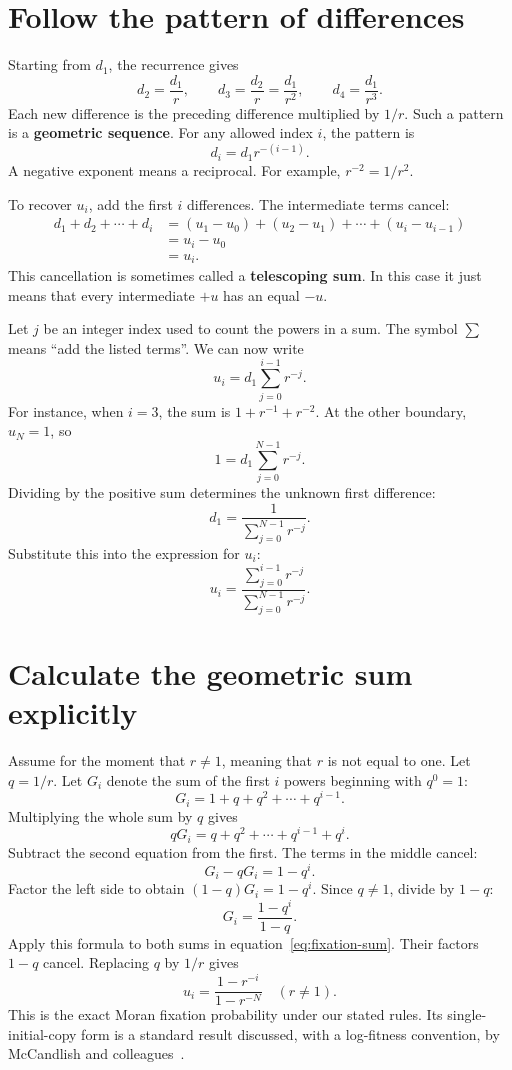 \section{Follow the pattern of differences}

Starting from \(d_1\), the recurrence gives
\[
 d_2=\frac{d_1}{r},\qquad
 d_3=\frac{d_2}{r}=\frac{d_1}{r^2},\qquad
 d_4=\frac{d_1}{r^3}.
\]
Each new difference is the preceding difference multiplied by \(1/r\).
Such a pattern is a \textbf{geometric sequence}. For any allowed index \(i\),
the pattern is
\[
 d_i=d_1r^{-(i-1)}.
\]
A negative exponent means a reciprocal. For example, \(r^{-2}=1/r^2\).

To recover \(u_i\), add the first \(i\) differences. The intermediate
terms cancel:
\begin{align*}
 d_1+d_2+\cdots+d_i
 &=(u_1-u_0)+(u_2-u_1)+\cdots+(u_i-u_{i-1})\\
 &=u_i-u_0\\
 &=u_i.
\end{align*}
This cancellation is sometimes called a \textbf{telescoping sum}. In this
case it just means that every intermediate \(+u\) has an equal \(-u\).

Let \(j\) be an integer index used to count the powers in a sum. The symbol
\(\sum\) means ``add the listed terms''. We can now write
\[
 u_i=d_1\sum_{j=0}^{i-1}r^{-j}.
\]
For instance, when \(i=3\), the sum is \(1+r^{-1}+r^{-2}\).
At the other boundary, \(u_N=1\), so
\[
 1=d_1\sum_{j=0}^{N-1}r^{-j}.
\]
Dividing by the positive sum determines the unknown first difference:
\[
 d_1=\frac{1}{\displaystyle\sum_{j=0}^{N-1}r^{-j}}.
\]
Substitute this into the expression for \(u_i\):
\begin{equation}
 u_i=\frac{\displaystyle\sum_{j=0}^{i-1}r^{-j}}
           {\displaystyle\sum_{j=0}^{N-1}r^{-j}}.
 \label{eq:fixation-sum}
\end{equation}

\section{Calculate the geometric sum explicitly}

Assume for the moment that \(r\neq1\), meaning that \(r\) is not equal
to one. Let \(q=1/r\). Let \(G_i\) denote the sum of the first \(i\)
powers beginning with \(q^0=1\):
\[
 G_i=1+q+q^2+\cdots+q^{i-1}.
\]
Multiplying the whole sum by \(q\) gives
\[
 qG_i=q+q^2+\cdots+q^{i-1}+q^i.
\]
Subtract the second equation from the first. The terms in the middle cancel:
\[
 G_i-qG_i=1-q^i.
\]
Factor the left side to obtain \((1-q)G_i=1-q^i\). Since \(q\neq1\),
divide by \(1-q\):
\[
 G_i=\frac{1-q^i}{1-q}.
\]
Apply this formula to both sums in equation~\eqref{eq:fixation-sum}.
Their factors \(1-q\) cancel. Replacing \(q\) by \(1/r\) gives
\begin{equation}
 \boxed{\displaystyle u_i=\frac{1-r^{-i}}{1-r^{-N}}\quad(r\neq1).}
 \label{eq:exact-fixation}
\end{equation}
This is the exact Moran fixation probability under our stated rules.
Its single-initial-copy form is a standard result discussed, with a
log-fitness convention, by McCandlish and colleagues~\cite{mccandlish2015}.

